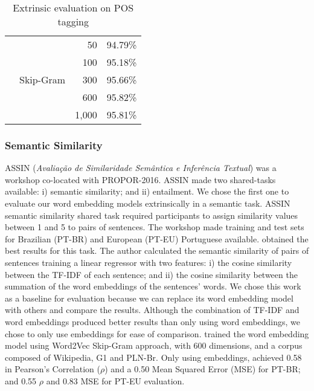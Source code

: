 \begin{table}[htb]
{\begin{tabular}[t]{@{}llrr@{}}
                           & \multirow{5}{*}{Skip-Gram} & 50                                & 94.79\%                               \\
                           &                            & 100                               & 95.18\%                               \\
                           &                            & 300                               & 95.66\%                               \\
                           &                            & 600                               & 95.82\%                               \\
                           &                            & 1,000                              & 95.81\%                               \\ \bottomrule
\end{tabular}}
\caption{Extrinsic evaluation on POS tagging}
\label{tab:pos}
\end{table}


\subsubsection*{Semantic Similarity}

ASSIN (\textit{Avaliação de Similaridade Semântica e Inferência Textual}) was a workshop co-located with PROPOR-2016. ASSIN made two shared-tasks available: i) semantic similarity; and ii) entailment. We chose the first one to evaluate our word embedding models extrinsically in a semantic task. ASSIN semantic similarity shared task required participants to assign similarity values between 1 and 5 to pairs of sentences. The workshop made training and test sets for Brazilian (PT-BR) and European (PT-EU) Portuguese available. \cite{hartmann2016} obtained the best results for this task. The author calculated the semantic similarity of pairs of sentences training a linear regressor with two features: i) the cosine similarity between the TF-IDF of each sentence; and ii) the cosine similarity between the summation of the word embeddings of the sentences' words. We chose this work as a baseline for evaluation because we can replace its word embedding model with others and compare the results. Although the combination of TF-IDF and word embeddings produced better results than only using word embeddings, we chose to only use embeddings for ease of comparison. \cite{hartmann2016} trained the word embedding model using Word2Vec Skip-Gram approach, with 600 dimensions, and a corpus composed of Wikipedia, G1 and PLN-Br. Only using embeddings, \cite{hartmann2016} achieved 0.58 in Pearson's Correlation ($\rho$) and a 0.50 Mean Squared Error (MSE) for PT-BR; and 0.55 $\rho$ and 0.83 MSE for PT-EU evaluation.

